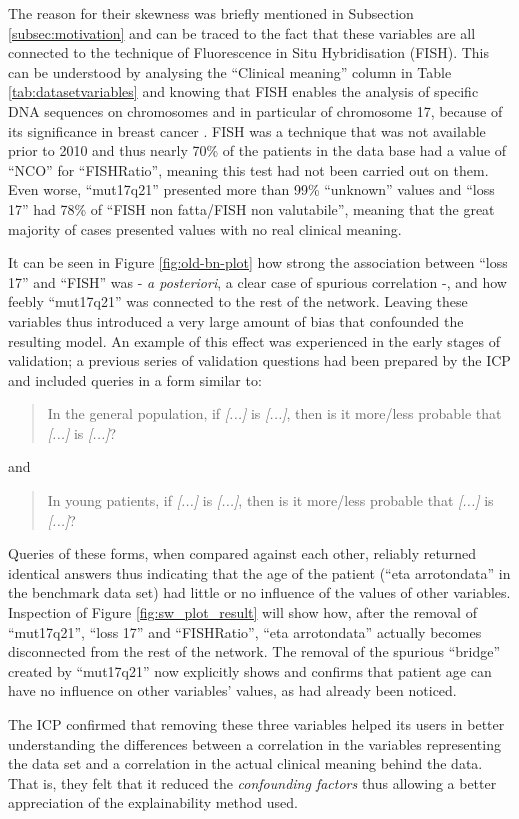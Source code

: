The reason for their skewness was briefly mentioned in Subsection \ref{subsec:motivation} and can be traced to the fact that these variables are all connected to the technique of Fluorescence in Situ Hybridisation (FISH).
This can be understood by analysing the \enquote{Clinical meaning} column in Table \ref{tab:datasetvariables} and knowing that FISH enables the analysis of specific DNA sequences on chromosomes and in particular of chromosome 17, because of its significance in breast cancer \citep{zhang2011important}.
FISH was a technique that was not available prior to 2010 and thus nearly 70\% of the patients in the data base had a value of \enquote{NCO} for \enquote{FISHRatio}, meaning this test had not been carried out on them.
Even worse, \enquote{mut17q21} presented more than 99\% \enquote{unknown} values and \enquote{loss 17} had 78\% of \enquote{FISH non fatta/FISH non valutabile}, meaning that the great majority of cases presented values with no real clinical meaning.

It can be seen in Figure \ref{fig:old-bn-plot} how strong the association between \enquote{loss 17} and \enquote{FISH} was - \textit{a posteriori}, a clear case of spurious correlation -, and how feebly \enquote{mut17q21} was connected to the rest of the network.
Leaving these variables thus introduced a very large amount of bias that confounded the resulting model.
An example of this effect was experienced in the early stages of validation; a previous series of validation questions had been prepared by the ICP and included queries in a form similar to:
\begin{quotation}
	In the general population, if \textit{[...]} is \textit{[...]}, then is it more/less probable that \textit{[...]} is \textit{[...]}?
\end{quotation}
and
\begin{quotation}
	In young patients, if \textit{[...]} is \textit{[...]}, then is it more/less probable that \textit{[...]} is \textit{[...]}?
\end{quotation}
Queries of these forms, when compared against each other, reliably returned identical answers thus indicating that the age of the patient (\enquote{eta arrotondata} in the benchmark data set) had little or no influence of the values of other variables.
Inspection of Figure \ref{fig:sw_plot_result} will show how, after the removal of \enquote{mut17q21}, \enquote{loss 17} and \enquote{FISHRatio}, \enquote{eta arrotondata} actually becomes disconnected from the rest of the network.
The removal of the spurious \enquote{bridge} created by \enquote{mut17q21} now explicitly shows and confirms that patient age can have no influence on other variables' values, as had already been noticed. 

The ICP confirmed that removing these three variables helped its users in better understanding the differences between a correlation in the variables representing the data set and a correlation in the actual clinical meaning behind the data.
That is, they felt that it reduced the \textit{confounding factors} thus allowing a better appreciation of the explainability method used.